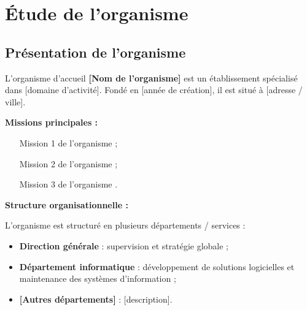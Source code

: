 \chapter{Étude de l'organisme}

\section{Présentation de l'organisme}


L'organisme d'accueil \textbf{[Nom de l'organisme]} est un établissement spécialisé dans [domaine d'activité]. Fondé en [année de création], il est situé à [adresse / ville].

\vspace{0.5cm}

\textbf{Missions principales :}
\begin{itemize}[noitemsep]
    \item [Mission 1 de l'organisme] ;
    \item [Mission 2 de l'organisme] ;
    \item [Mission 3 de l'organisme].
\end{itemize}

\vspace{0.5cm}

\textbf{Structure organisationnelle :}

L'organisme est structuré en plusieurs départements / services :
\begin{itemize}[noitemsep]
    \item \textbf{Direction générale} : supervision et stratégie globale ;
    \item \textbf{Département informatique} : développement de solutions logicielles et maintenance des systèmes d'information ;
    \item \textbf{[Autres départements]} : [description].
\end{itemize}


